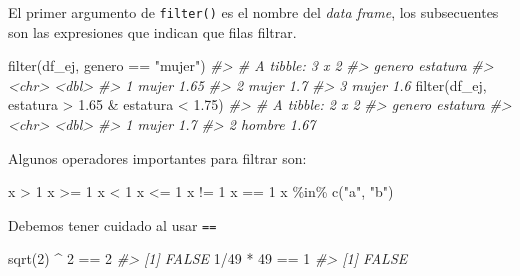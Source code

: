 \documentclass[
]{book}
\newenvironment{Shaded}{\begin{snugshade}}{\end{snugshade}}
\newcommand{\CommentTok}[1]{\textcolor[rgb]{0.56,0.35,0.01}{\textit{#1}}}
\newcommand{\DecValTok}[1]{\textcolor[rgb]{0.00,0.00,0.81}{#1}}
\newcommand{\FloatTok}[1]{\textcolor[rgb]{0.00,0.00,0.81}{#1}}
\newcommand{\FunctionTok}[1]{\textcolor[rgb]{0.00,0.00,0.00}{#1}}
\newcommand{\NormalTok}[1]{#1}
\newcommand{\SpecialCharTok}[1]{\textcolor[rgb]{0.00,0.00,0.00}{#1}}
\newcommand{\StringTok}[1]{\textcolor[rgb]{0.31,0.60,0.02}{#1}}
\begin{document}
El primer argumento de \texttt{filter()} es el nombre del \emph{data frame}, los subsecuentes
son las expresiones que indican que filas filtrar.

\begin{Shaded}
\begin{Highlighting}[]
\FunctionTok{filter}\NormalTok{(df\_ej, genero }\SpecialCharTok{==} \StringTok{"mujer"}\NormalTok{)}
\CommentTok{\#\textgreater{} \# A tibble: 3 x 2}
\CommentTok{\#\textgreater{}   genero estatura}
\CommentTok{\#\textgreater{}   \textless{}chr\textgreater{}     \textless{}dbl\textgreater{}}
\CommentTok{\#\textgreater{} 1 mujer      1.65}
\CommentTok{\#\textgreater{} 2 mujer      1.7 }
\CommentTok{\#\textgreater{} 3 mujer      1.6}
\FunctionTok{filter}\NormalTok{(df\_ej, estatura }\SpecialCharTok{\textgreater{}} \FloatTok{1.65} \SpecialCharTok{\&}\NormalTok{ estatura }\SpecialCharTok{\textless{}} \FloatTok{1.75}\NormalTok{)}
\CommentTok{\#\textgreater{} \# A tibble: 2 x 2}
\CommentTok{\#\textgreater{}   genero estatura}
\CommentTok{\#\textgreater{}   \textless{}chr\textgreater{}     \textless{}dbl\textgreater{}}
\CommentTok{\#\textgreater{} 1 mujer      1.7 }
\CommentTok{\#\textgreater{} 2 hombre     1.67}
\end{Highlighting}
\end{Shaded}

Algunos operadores importantes para filtrar son:

\begin{Shaded}
\begin{Highlighting}[]
\NormalTok{x }\SpecialCharTok{\textgreater{}} \DecValTok{1}
\NormalTok{x }\SpecialCharTok{\textgreater{}=} \DecValTok{1}
\NormalTok{x }\SpecialCharTok{\textless{}} \DecValTok{1}
\NormalTok{x }\SpecialCharTok{\textless{}=} \DecValTok{1}
\NormalTok{x }\SpecialCharTok{!=} \DecValTok{1}
\NormalTok{x }\SpecialCharTok{==} \DecValTok{1}
\NormalTok{x }\SpecialCharTok{\%in\%} \FunctionTok{c}\NormalTok{(}\StringTok{"a"}\NormalTok{, }\StringTok{"b"}\NormalTok{)}
\end{Highlighting}
\end{Shaded}

Debemos tener cuidado al usar \texttt{==}

\begin{Shaded}
\begin{Highlighting}[]
\FunctionTok{sqrt}\NormalTok{(}\DecValTok{2}\NormalTok{) }\SpecialCharTok{\^{}} \DecValTok{2} \SpecialCharTok{==} \DecValTok{2}
\CommentTok{\#\textgreater{} [1] FALSE}
\DecValTok{1}\SpecialCharTok{/}\DecValTok{49} \SpecialCharTok{*} \DecValTok{49} \SpecialCharTok{==} \DecValTok{1}
\CommentTok{\#\textgreater{} [1] FALSE}
\end{Highlighting}
\end{Shaded}
\end{document}
